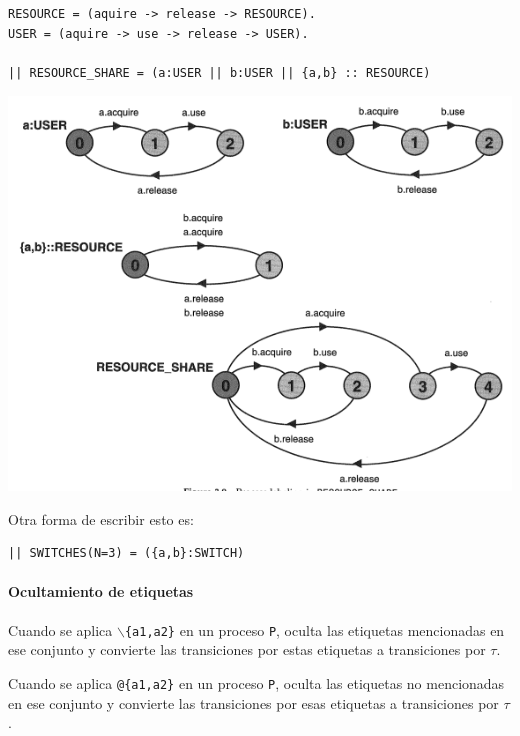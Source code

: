 \begin{verbatim}
RESOURCE = (aquire -> release -> RESOURCE).
USER = (aquire -> use -> release -> USER).

|| RESOURCE_SHARE = (a:USER || b:USER || {a,b} :: RESOURCE)
\end{verbatim}
\begin{center}
\includegraphics[scale=0.5]{imagenes/lts-resourceShare}
\end{center}

Otra forma de escribir esto es:
\begin{verbatim}
|| SWITCHES(N=3) = ({a,b}:SWITCH)
\end{verbatim}

\paragraph{Ocultamiento de etiquetas}
Cuando se aplica \texttt{$\backslash$\{a1,a2\}} en un proceso \texttt{P}, oculta las etiquetas mencionadas en ese conjunto y convierte las transiciones por estas etiquetas a transiciones por $\tau$.

Cuando se aplica \texttt{@\{a1,a2\}} en un proceso \texttt{P}, oculta las etiquetas no mencionadas en ese conjunto y convierte las transiciones por 
esas etiquetas a transiciones por $\tau$.

